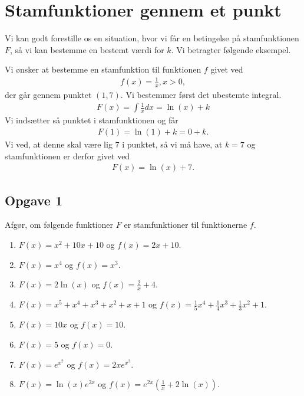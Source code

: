 \newpage

\section*{Stamfunktioner gennem et punkt}
Vi kan godt forestille os en situation, hvor vi får en betingelse på stamfunktionen $F$, så vi kan bestemme en bestemt 
værdi for $k$. Vi betragter følgende eksempel.

\begin{exa}
	Vi ønsker at bestemme en stamfunktion til funktionen $f$ givet ved
	\begin{align*}
		f(x) = \frac{1}{x}, x > 0,
	\end{align*}
	der går gennem punktet $(1,7)$. Vi bestemmer først det ubestemte integral.
	\begin{align*}
		F(x) = \int \frac{1}{x} dx = \ln(x) + k
	\end{align*}
	Vi indsætter så punktet i stamfunktionen og får
	\begin{align*}
		F(1) = \ln(1) + k = 0 + k.
	\end{align*}
	Vi ved, at denne skal være lig $7$ i punktet, så vi må have, at $k = 7$ og stamfunktionen er derfor givet ved
	\begin{align*}
		F(x) = \ln(x) + 7.
	\end{align*}
\end{exa}



\subsection*{Opgave 1}
Afgør, om følgende funktioner $F$ er stamfunktioner til funktionerne $f$.
\begin{enumerate}[label=\roman*)]
	\item $F(x) = x^2 + 10x + 10$ og $f(x) = 2x+10$.
	\item $F(x) = x^4$ og $f(x) = x^3$.
	\item $F(x) = 2\ln(x)$ og $f(x) = \frac{2}{x}+4$.
	\item $F(x) = x^5+x^4+x^3+x^2+x+1$ og $f(x) = \frac{1}{5}x^4+\frac{1}{4}x^3+\frac{1}{3}x^2+1$.
	\item $F(x) = 10x$ og $f(x) = 10$.
	\item $F(x) = 5$ og $f(x) = 0$.
	\item $F(x) = e^{x^2}$ og $f(x) = 2xe^{x^2}$.
	\item $F(x) = \ln(x)e^{2x}$ og $f(x) = e^{2x}(\frac{1}{x}+2\ln(x))$.
\end{enumerate}
